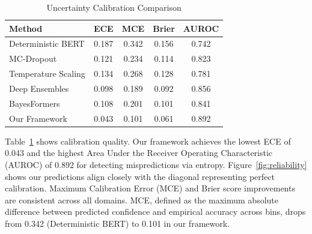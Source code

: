 \documentclass[12pt,a4paper]{article}
\theoremstyle{definition}
\begin{document}
\begin{table}[!t]
\caption{Uncertainty Calibration Comparison}
\label{tab:calibration}
\centering
\small
\begin{tabular}{@{}lcccc@{}}
\toprule
Method & ECE & MCE & Brier & AUROC \\
\midrule
Deterministic BERT   & 0.187 & 0.342 & 0.156 & 0.742 \\
MC-Dropout           & 0.121 & 0.234 & 0.114 & 0.823 \\
Temperature Scaling  & 0.134 & 0.268 & 0.128 & 0.781 \\
Deep Ensembles       & 0.098 & 0.189 & 0.092 & 0.856 \\
BayesFormers         & 0.108 & 0.201 & 0.101 & 0.841 \\
Our Framework & 0.043 & 0.101 & 0.061 & 0.892 \\
\bottomrule
\end{tabular}
\end{table}

Table~\ref{tab:calibration} shows calibration quality. Our framework achieves the lowest ECE of 0.043 and the highest Area Under the Receiver Operating Characteristic (AUROC) of 0.892 for detecting mispredictions via entropy. Figure~\ref{fig:reliability} shows our predictions align closely with the diagonal representing perfect calibration. Maximum Calibration Error (MCE) and Brier score improvements are consistent across all domains. MCE, defined as the maximum absolute difference between predicted confidence and empirical accuracy across bins, drops from 0.342 (Deterministic BERT) to 0.101 in our framework.
\end{document}
